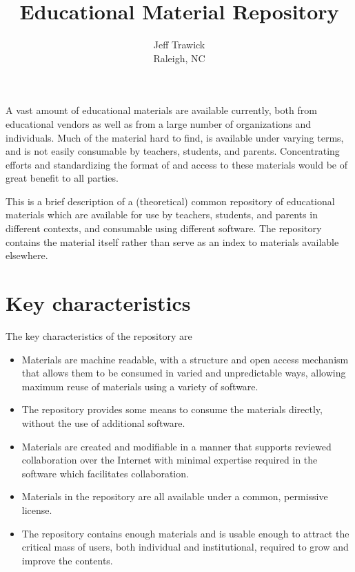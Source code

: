 
\title{Educational Material Repository}
\author{Jeff Trawick\\Raleigh, NC}
\maketitle
A vast amount of educational materials are available currently, both from
educational vendors as well as from a large number of
organizations and individuals.  Much of the material hard to find,
is available under varying terms, and is not easily consumable by teachers,
students, and parents.  Concentrating efforts and standardizing the format
of and access to these materials would be of great benefit to all parties.

This is a brief description of a (theoretical) common repository of educational
materials which are available for use by teachers, students, and parents in 
different contexts, and consumable using different software.  The repository contains
the material itself rather than serve as an index to materials available elsewhere.

\section*{Key characteristics}

The key characteristics of the repository are

\begin{itemize}
\item Materials are machine readable, with a structure and open access mechanism
that allows them to be consumed in varied and unpredictable ways, allowing
maximum reuse of materials using a variety of software.
\item The repository provides some means to consume the materials directly,
without the use of additional software.
\item Materials are created and modifiable in a manner that supports reviewed
collaboration over the Internet with minimal expertise required in the software
which facilitates collaboration.
\item Materials in the repository are all available under a common, permissive
license.
\item The repository contains enough materials and is usable enough to attract
the critical mass of users, both individual and institutional, required to 
grow and improve the contents.
\end{itemize}

